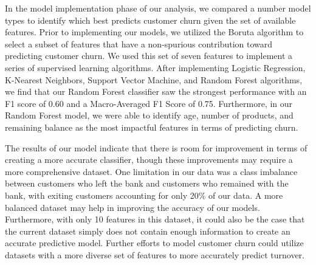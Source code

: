 \documentclass[twoside,twocolumn]{article}
\begin{document}
In the model implementation phase of our analysis, we compared a number model types to identify which best predicts customer churn given the set of available features.  Prior to implementing our models, we utilized the Boruta algorithm to select a subset of features that have a non-spurious contribution toward predicting customer churn.  We used this set of seven features to implement a series of supervised learning algorithms.  After implementing Logistic Regression, K-Nearest Neighbors, Support Vector Machine, and Random Forest algorithms, we find that our Random Forest classifier saw the strongest performance with an F1 score of 0.60 and a Macro-Averaged F1 Score of 0.75.  Furthermore, in our Random Forest model, we were able to identify age, number of products, and remaining balance as the most impactful features in terms of predicting churn.

The results of our model indicate that there is room for improvement in terms of creating a more accurate classifier, though these improvements may require a more comprehensive dataset.  One limitation in our data was a class imbalance between customers who left the bank and customers who remained with the bank, with exiting customers accounting for only 20\% of our data.  A more balanced dataset may help in improving the accuracy of our models.  Furthermore, with only 10 features in this dataset, it could also be the case that the current dataset simply does not contain enough information to create an accurate predictive model.  Further efforts to model customer churn could utilize datasets with a more diverse set of features to more accurately predict turnover.




 

\end{document}
